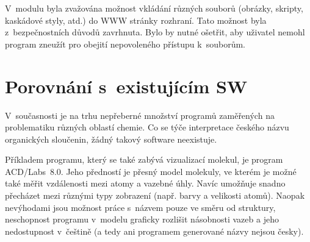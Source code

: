 V~modulu  byla zvažována možnost vkládání různých souborů
(obrázky, skripty, kaskádové styly, atd.) do WWW stránky rozhraní. Tato možnost
byla z~bezpečnostních důvodů zavrhnuta. Bylo by nutné ošetřit, aby uživatel
nemohl program zneužít pro obejití nepovoleného přístupu k~souborům.

\section{Porovnání s~existujícím SW}
V~současnosti je na trhu nepřeberné množství programů zaměřených na problematiku
různých oblastí chemie. Co se týče interpretace českého názvu organických
sloučenin, žádný takový software neexistuje.

Příkladem programu, který se také zabývá vizualizací molekul, je program
ACD/Labs~8.0. Jeho předností je přesný model molekuly, ve kterém je možné také
měřit vzdálenosti mezi atomy a vazebné úhly. Navíc umožňuje snadno přecházet
mezi různými typy zobrazení (např. barvy a velikosti atomů). Naopak nevýhodami
jsou možnost práce s~názvem pouze ve směru od struktury, neschopnost programu
v~modelu graficky rozlišit násobnosti vazeb a jeho nedostupnost v~češtině (a
tedy ani programem generované názvy nejsou česky).

